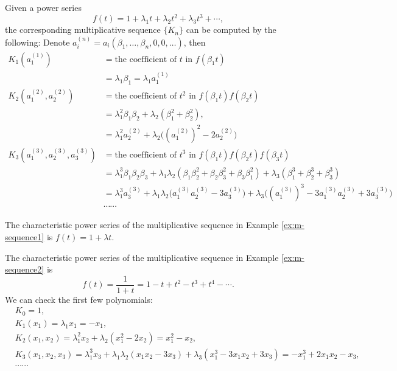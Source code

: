 \begin{remark}
    Given a power series 
    \begin{equation*}
        f(t) = 1 + \lambda_1 t + \lambda_2 t^2 + \lambda_3 t^3 + \cdots,
    \end{equation*}
    the corresponding multiplicative sequence $\{K_n\}$ can be computed by the following: 
    Denote $a_i^{(n)} = a_i(\beta_1,\dots,\beta_n,0,0,\dots)$, then
    \begin{align*}
        K_1(a_1^{(1)}) &= \text{the coefficient of } t \text{ in } f(\beta_1 t) \\
        & = \lambda_1 \beta_1 = \lambda_1 a_1^{(1)} \\
        K_2(a_1^{(2)},a_2^{(2)}) &= \text{the coefficient of } t^2 \text{ in } f(\beta_1 t) f(\beta_2 t) \\
        & = \lambda_1^2 \beta_1\beta_2 + \lambda_2 (\beta_1^2 + \beta_2^2), \\
        & = \lambda_1^2 a_2^{(2)} + \lambda_2 \big((a_1^{(2)})^2 - 2a_2^{(2)}\big) \\
        K_3(a_1^{(3)},a_2^{(3)},a_3^{(3)}) &= \text{the coefficient of } t^3 \text{ in } f(\beta_1 t) f(\beta_2 t) f(\beta_3 t) \\
        & = \lambda_1^3 \beta_1\beta_2\beta_3 + \lambda_1\lambda_2 (\beta_1\beta_2^2 + \beta_2\beta_3^2 + \beta_3\beta_1^2) + \lambda_3 (\beta_1^3 + \beta_2^3 + \beta_3^3) \\
        & = \lambda_1^3 a_3^{(3)} + \lambda_1\lambda_2 \big(a_1^{(3)} a_2^{(3)} - 3 a_3^{(3)}\big) + \lambda_3 \big((a_1^{(3)})^3 - 3 a_1^{(3)} a_2^{(3)} + 3 a_3^{(3)}\big) \\
        & \cdots\cdots
    \end{align*}
\end{remark}
\begin{example}
    The characteristic power series of the multiplicative sequence in Example \ref{ex:m-sequence1} is $f(t) = 1 + \lambda t$.
\end{example}
\begin{example}
    The characteristic power series of the multiplicative sequence in Example \ref{ex:m-sequence2} is 
    \begin{equation*}
        f(t) = \frac{1}{1+t} = 1 - t + t^2 - t^3 + t^4 - \cdots.
    \end{equation*}
    We can check the first few polynomials:
    \begin{align*}
        &K_0 = 1, \\
        &K_1(x_1) = \lambda_1 x_1 = -x_1, \\
        &K_2(x_1,x_2) = \lambda_1^2 x_2 + \lambda_2 (x_1^2 - 2x_2) = x_1^2 - x_2, \\
        &K_3(x_1,x_2,x_3) = \lambda_1^3 x_3 + \lambda_1\lambda_2 (x_1 x_2 - 3 x_3) + \lambda_3 (x_1^3 - 3 x_1 x_2 + 3 x_3) = -x_1^3 + 2 x_1 x_2 - x_3, \\[4pt]
        &\cdots\cdots
    \end{align*}
\end{example}
